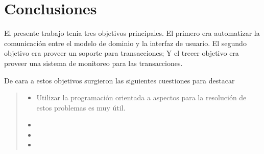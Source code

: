 \section{Conclusiones}
\label{sec:conclusions}

El presente trabajo tenia tres objetivos principales. El primero era automatizar
la comunicación entre el modelo de dominio y la interfaz de usuario. El segundo
objetivo era proveer un soporte para transacciones; Y el trecer objetivo era
proveer una sistema de monitoreo para las transacciones.

De cara a estos objetivos surgieron las siguientes cuestiones para destacar

\begin{quote}

	\begin{itemize}
	  
		\item Utilizar la programación orientada a aspectos para la resolución de
		estos problemas es muy útil.
		
		\item  
		\item 
		\item 
	  
	\end{itemize}
	
\end{quote}